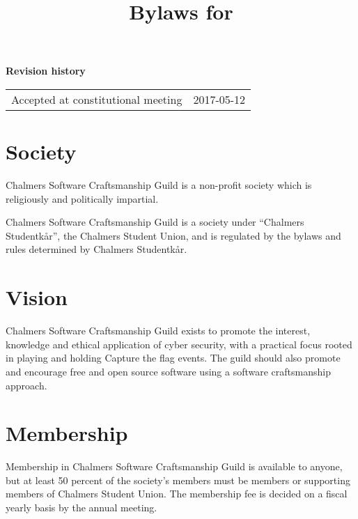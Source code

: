 \documentclass[a4paper]{article}
\author{}
\date{}
\title{\huge Bylaws for\\
    \huge \name}
\newcommand{\name}{Chalmers Software Craftsmanship Guild}
\begin{document}

\maketitle

\begin{center}
    \textbf{Revision history}\\
    \begin{tabu}{ll}
        Accepted at constitutional meeting  & 2017-05-12
    \end{tabu}
\end{center}



\section{Society}

\name{} is a non-profit society which is religiously and politically impartial.

\name{} is a society under ``Chalmers Studentkår'', the Chalmers Student Union,
and is regulated by the bylaws and rules determined by Chalmers Studentkår.

\section{Vision}
\label{sec:vision}

\name{} exists to promote the interest, knowledge and ethical application of
cyber security, with a practical focus rooted in playing and holding Capture
the flag events. The guild should also promote and encourage free and open
source software using a software craftsmanship approach.


\section{Membership}

Membership in \name{} is available to anyone, but at least 50 percent of the
society's members must be members or supporting members of Chalmers Student
Union. The membership fee is decided on a fiscal yearly basis by the annual
meeting.
\end{document}
